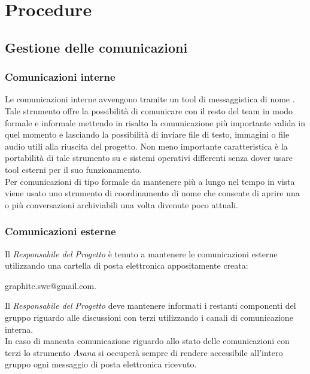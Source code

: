 \documentclass[./../NomeDocumento.tex]{subfiles}
\begin{document}
	\section {Procedure}
	
	\subsection{Gestione delle comunicazioni}
	
	\subsubsection{Comunicazioni interne}
	
	Le comunicazioni interne avvengono tramite un tool di messaggistica di nome . Tale strumento offre la possibilità di comunicare con il resto del team in modo formale e informale mettendo in risalto la comunicazione più importante valida in quel momento e lasciando la possibilità di inviare file di testo, immagini o file audio utili alla riuscita del progetto.
	Non meno importante caratteristica è la portabilità di tale strumento su  e sistemi operativi differenti senza dover usare tool esterni per il suo funzionamento.
	\\ \noindent Per comunicazioni di tipo formale da mantenere più a lungo nel tempo in vista viene usato uno strumento di coordinamento di nome  che consente di aprire una o più conversazioni archiviabili una volta divenute poco attuali.
	
	\subsubsection{Comunicazioni esterne}
	
	Il \textit{Responsabile del Progetto} è tenuto a mantenere le comunicazioni esterne utilizzando una cartella di posta elettronica appositamente creata:
	\centerline{graphite.swe@gmail.com.}
	Il \textit{Responsabile del Progetto} deve mantenere informati i restanti componenti del gruppo riguardo alle discussioni con terzi utilizzando i canali di comunicazione interna. 
	\\ \noindent In caso di mancata comunicazione riguardo allo stato delle comunicazioni con terzi lo strumento \textit{Asana} si occuperà sempre di rendere accessibile all'intero gruppo ogni messaggio di posta elettronica ricevuto.
	
\end{document}
